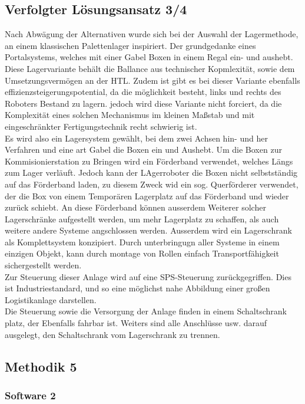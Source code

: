 \subsection{Verfolgter Lösungsansatz 3/4}
Nach Abwägung der Alternativen wurde sich bei der Auswahl der Lagermethode, an einem klassischen Palettenlager inspiriert. Der grundgedanke eines Portalsystems, welches mit einer Gabel Boxen in einem Regal ein- und aushebt. Diese Lagervariante behält die Ballance aus technischer Kopmlexität, sowie dem Umsetzungsvermögen an der HTL. Zudem ist gibt es bei dieser Variante ebenfalls effizienzsteigerungspotential, da die möglichkeit besteht, links und rechts des Roboters Bestand zu lagern. jedoch wird diese Variante nicht forciert, da die Komplexität eines solchen Mechanismus im kleinen Maßstab und mit eingeschränkter Fertigungstechnik recht schwierig ist.\\ Es wird also ein Lagersystem gewählt, bei dem zwei Achsen hin- und her Verfahren und eine art Gabel die Boxen ein und Aushebt. Um die Boxen zur Kommisionierstation zu Bringen wird ein Förderband verwendet, welches Längs zum Lager verläuft. Jedoch kann der LAgerroboter die Boxen nicht selbstständig auf das Förderband laden, zu diesem Zweck wid ein sog. Querförderer verwendet, der die Box von einem Temporären Lagerplatz auf das Förderband und wieder zurück schiebt. An diese Förderband können ausserdem Weiterer solcher Lagerschränke aufgestellt werden, um mehr Lagerplatz zu schaffen, als auch weitere andere Systeme angschlossen werden. Ausserdem wird ein Lagerschrank als Komplettsystem konzipiert. Durch unterbringugn aller Systeme in einem einzigen Objekt, kann durch montage von Rollen einfach Transportfähigkeit sichergestellt werden.\\
Zur Steuerung dieser Anlage wird auf eine SPS-Steuerung zurückgegriffen. Dies ist Industriestandard, und so eine möglichst nahe Abbildung einer großen Logistikanlage darstellen. \\
Die Steuerung sowie die Versorgung der Anlage finden in einem Schaltschrank platz, der Ebenfalls fahrbar ist. Weiters sind alle Anschlüsse usw. darauf ausgelegt, den Schaltschrank vom Lagerschrank zu trennen. 
\subsection{Methodik 5}

\subsubsection{Software 2}

